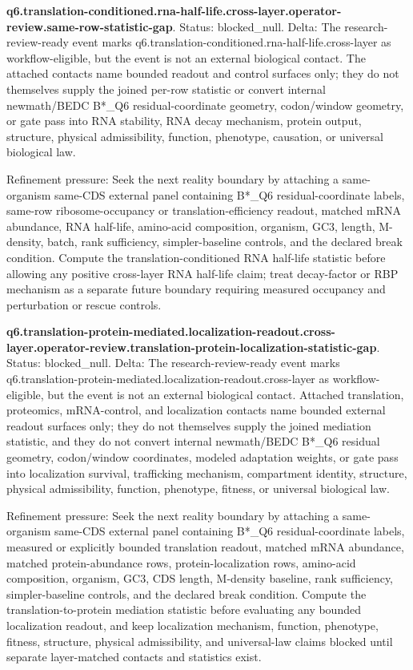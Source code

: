 \textbf{q6.translation-conditioned.rna-half-life.cross-layer.operator-review.same-row-statistic-gap}. Status: blocked\_null. Delta: The research-review-ready event marks q6.translation-conditioned.rna-half-life.cross-layer as workflow-eligible, but the event is not an external biological contact. The attached contacts name bounded readout and control surfaces only; they do not themselves supply the joined per-row statistic or convert internal newmath/BEDC B*\_Q6 residual-coordinate geometry, codon/window geometry, or gate pass into RNA stability, RNA decay mechanism, protein output, structure, physical admissibility, function, phenotype, causation, or universal biological law.

Refinement pressure: Seek the next reality boundary by attaching a same-organism same-CDS external panel containing B*\_Q6 residual-coordinate labels, same-row ribosome-occupancy or translation-efficiency readout, matched mRNA abundance, RNA half-life, amino-acid composition, organism, GC3, length, M-density, batch, rank sufficiency, simpler-baseline controls, and the declared break condition. Compute the translation-conditioned RNA half-life statistic before allowing any positive cross-layer RNA half-life claim; treat decay-factor or RBP mechanism as a separate future boundary requiring measured occupancy and perturbation or rescue controls.

\textbf{q6.translation-protein-mediated.localization-readout.cross-layer.operator-review.translation-protein-localization-statistic-gap}. Status: blocked\_null. Delta: The research-review-ready event marks q6.translation-protein-mediated.localization-readout.cross-layer as workflow-eligible, but the event is not an external biological contact. Attached translation, proteomics, mRNA-control, and localization contacts name bounded external readout surfaces only; they do not themselves supply the joined mediation statistic, and they do not convert internal newmath/BEDC B*\_Q6 residual geometry, codon/window coordinates, modeled adaptation weights, or gate pass into localization survival, trafficking mechanism, compartment identity, structure, physical admissibility, function, phenotype, fitness, or universal biological law.

Refinement pressure: Seek the next reality boundary by attaching a same-organism same-CDS external panel containing B*\_Q6 residual-coordinate labels, measured or explicitly bounded translation readout, matched mRNA abundance, matched protein-abundance rows, protein-localization rows, amino-acid composition, organism, GC3, CDS length, M-density baseline, rank sufficiency, simpler-baseline controls, and the declared break condition. Compute the translation-to-protein mediation statistic before evaluating any bounded localization readout, and keep localization mechanism, function, phenotype, fitness, structure, physical admissibility, and universal-law claims blocked until separate layer-matched contacts and statistics exist.

